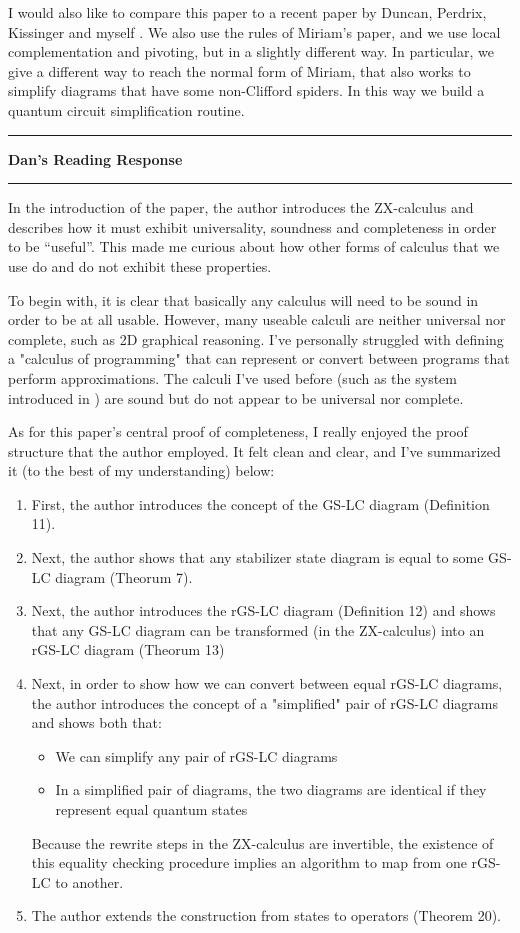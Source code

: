 \documentclass{amsart}
\newcommand{\iam}[1]{
  \vspace{0.25em}
  \hrule
  \vspace{0.25em}
  \textbf{{#1}'s Reading Response}
  \vspace{0.25em}
  \hrule
  \vspace{1em}
}
\begin{document}
I would also like to compare this paper to a recent paper by Duncan, Perdrix, Kissinger and myself \cite{ZXCircuitOptimisation}. We also use the rules of Miriam's paper, and we use local complementation and pivoting, but in a slightly different way. In particular, we give a different way to reach the normal form of Miriam, that also works to simplify diagrams that have some non-Clifford spiders. In this way we build a quantum circuit simplification routine.

\iam{Dan}

In the introduction of the paper, the author introduces the ZX-calculus and describes how it must exhibit universality, soundness and completeness in order to be ``useful''. This made me curious about how other forms of calculus that we use do and do not exhibit these properties.

To begin with, it is clear that basically any calculus will need to be sound in order to be at all usable. However, many useable calculi are neither universal nor complete, such as 2D graphical reasoning. I've personally struggled with defining a "calculus of programming" that can represent or convert between programs that perform approximations. The calculi I've used before (such as the system introduced in \cite{BirdAOP}) are sound but do not appear to be universal nor complete.

As for this paper's central proof of completeness, I really enjoyed the proof structure that the author employed. It felt clean and clear, and I've summarized it (to the best of my understanding) below:
\begin{enumerate}
  \item{First, the author introduces the concept of the GS-LC diagram (Definition 11).}
  \item{Next, the author shows that any stabilizer state diagram is equal to some GS-LC diagram (Theorum 7).}
  \item{Next, the author introduces the rGS-LC diagram (Definition 12) and shows that any GS-LC diagram can be transformed (in the ZX-calculus) into an rGS-LC diagram (Theorum 13)}
  \item{Next, in order to show how we can convert between equal rGS-LC diagrams, the author introduces the concept of a "simplified" pair of rGS-LC diagrams and shows both that:
    \begin{itemize}
      \item{We can simplify any pair of rGS-LC diagrams}
      \item{In a simplified pair of diagrams, the two diagrams are identical if they represent equal quantum states}
    \end{itemize}
    Because the rewrite steps in the ZX-calculus are invertible, the existence of this equality checking procedure implies an algorithm to map from one rGS-LC to another.}
  \item{The author extends the construction from states to operators (Theorem 20).}
\end{enumerate}
\end{document}
